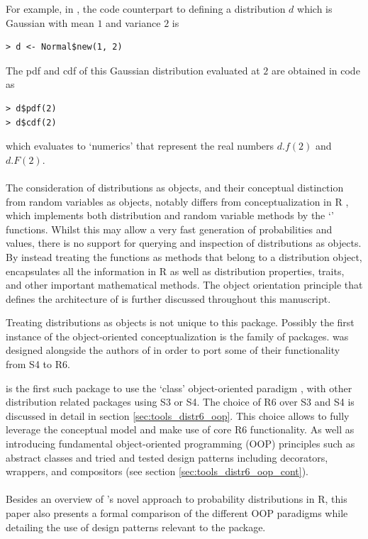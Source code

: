 For example, in , the code counterpart to defining a distribution $d$ which is Gaussian with mean $1$ and variance $2$ is
\begin{verbatim}
> d <- Normal$new(1, 2)
\end{verbatim}
The pdf and cdf of this Gaussian distribution evaluated at $2$ are obtained in code as
\begin{verbatim}
> d$pdf(2)
> d$cdf(2)
\end{verbatim}
which evaluates to `numerics' that represent the real numbers $d.f(2)$ and $d.F(2)$.
\\\\
The consideration of distributions as objects, and their conceptual distinction from random variables as objects, notably differs from conceptualization in R , which implements both distribution and random variable methods by the `' functions. Whilst this may allow a very fast generation of probabilities and values, there is no support for querying and inspection of distributions as objects. By instead treating the  functions as methods that belong to a distribution object,  encapsulates all the information in R  as well as distribution properties, traits, and other important mathematical methods. The object orientation principle that defines the architecture of  is further discussed throughout this manuscript.

Treating distributions as objects is not unique to this package. Possibly the first instance of the object-oriented conceptualization is the  \citep{pkgdistr} family of packages.  was designed alongside the authors of  in order to port some of their functionality from S4 to R6.

  is the first such package to use the `class' object-oriented paradigm  \citep{pkgR6}, with other distribution related packages using S3 or S4. The choice of R6 over S3 and S4 is discussed in detail in section \ref{sec:tools_distr6_oop}. This choice allows  to fully leverage the conceptual model and make use of core R6 functionality. As well as introducing fundamental object-oriented programming (OOP) principles such as abstract classes and tried and tested design patterns \citep{Gamma1996} including decorators, wrappers, and compositors (see section \ref{sec:tools_distr6_oop_cont}).
\\\\
Besides an overview of 's novel approach to probability distributions in R, this paper also presents a formal comparison of the different OOP paradigms while detailing the use of design patterns relevant to the package.


